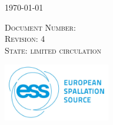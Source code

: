 \documentclass[12pt]{article}
\begin{document}
\begin{titlepage}


\vspace{7mm}
\begin{center}
{\large \today}
\end{center}
 \textsc{\small Document Number: }\\
 \textsc{\small Revision: 4}\\
  \textsc{\small State: limited circulation}\\
\vspace{21 mm}
\newcommand*{\plogo}{\includegraphics[width=0.35\textwidth]{ESS_logo.png}}

\plogo\\[1cm] %
 

\vfill %



\pagebreak
\newpage


\end{titlepage}
\end{document}
